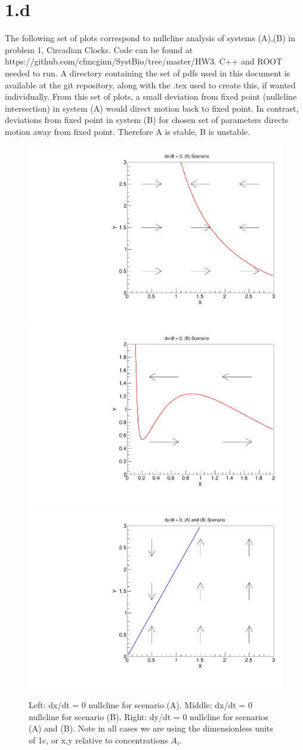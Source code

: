 \documentclass{article}
\begin{document}
\section{1.d}

The following set of plots correspond to nullcline analysis of systems (A),(B) in problem 1, Circadian Clocks. Code can be found at https://github.com/cfmcginn/SystBio/tree/master/HW3. C++ and ROOT needed to run. A directory containing the set of pdfs used in this document is available at the git repository, along with the .tex used to create this, if wanted individually. From this set of plots, a small deviation from fixed point (nullcline intersection) in system (A) would direct motion back to fixed point. In contrast, deviations from fixed point in system (B) for chosen set of parameters directs motion away from fixed point. Therefore A is stable, B is unstable.

\begin{figure}[H]
    \centering
    \includegraphics[width=.32\textwidth]{xDotNull1Canv.pdf} 
    \includegraphics[width=.32\textwidth]{xDotNull2Canv.pdf}
    \includegraphics[width=.32\textwidth]{yDotNullCanv.pdf}
    \caption{Left: dx/dt = 0 nullcline for scenario (A). Middle: dx/dt = 0 nullcline for scenario (B). Right: dy/dt = 0 nullcline for scenarios (A) and (B). Note in all cases we are using the dimensionless units of 1c, or x,y relative to concentrations $A_{i}$.}
    \label{}
\end{figure}
\end{document}
